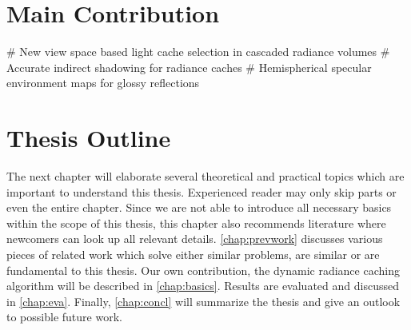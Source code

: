 \documentclass[thesis.tex]{subfiles}
\begin{document}

\section{Main Contribution}
\begin{easylist}
# New view space based light cache selection in cascaded radiance volumes
# Accurate indirect shadowing for radiance caches
# Hemispherical specular environment maps for glossy reflections
\end{easylist}


\section{Thesis Outline}
The next chapter will elaborate several theoretical and practical topics which are important to understand this thesis. %
Experienced reader may only skip parts or even the entire chapter.
Since we are not able to introduce all necessary basics within the scope of this thesis, this chapter also recommends literature where newcomers can look up all relevant details.
\autoref{chap:prevwork} discusses various pieces of related work which solve either similar problems, are similar or are fundamental to this thesis.
Our own contribution, the dynamic radiance caching algorithm will be described in \autoref{chap:basics}.
Results are evaluated and discussed in \autoref{chap:eva}.
Finally, \autoref{chap:concl} will summarize the thesis and give an outlook to possible future work.

\subfilebib %
\end{document}
